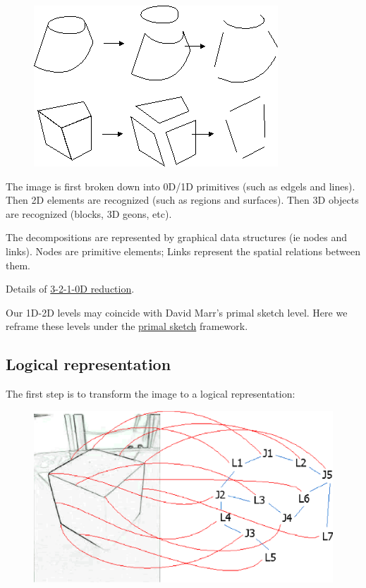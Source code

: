 \begin{figure}[H]
\centering
\includegraphics[scale=0.6, bb=0 0 346 228]{PolygonDecomposition.PNG}
\end{figure}

The image is first broken down into 0D/1D primitives (such as edgels and lines). Then 2D elements are recognized (such as regions and surfaces). Then 3D objects are recognized (blocks, 3D geons, etc).

The decompositions are represented by graphical data structures (ie nodes and links). Nodes are primitive elements; Links represent the spatial relations between them.

Details of \href{Vis-3210D-Reduction.htm}{3-2-1-0D reduction}.

Our 1D-2D levels may coincide with David Marr's primal sketch level. Here we reframe these levels under the \href{Vis-PrimalSketch.htm}{primal sketch} framework.

\subsection{Logical representation}

The first step is to transform the image to a logical representation:

\begin{figure}[H]
\centering
\includegraphics[scale=0.8, bb=0 0 568 326]{VisioLogicalTransform.eps}
\end{figure}

